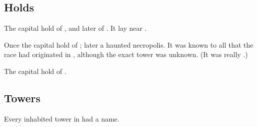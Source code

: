 \subsection{Holds}





\begin{gloss}



  \gitem{\Cathedon}
  The capital hold of , and later of \CiriathSepher. 
  It lay near \Hyardes. 



  \gitem[Hyardes]{\Hyardes}
  Once the capital hold of ; later a haunted necropolis.
  It was known to all \resphain that the \resphan race had originated in \Tarcharos, although the exact tower was unknown. 
  (It was really .)



  \gitem{\Surammas}
  The capital hold of \Mystraacht. 



\end{gloss}








\subsection{Towers}
Every inhabited tower in \Nyx had a name. 





